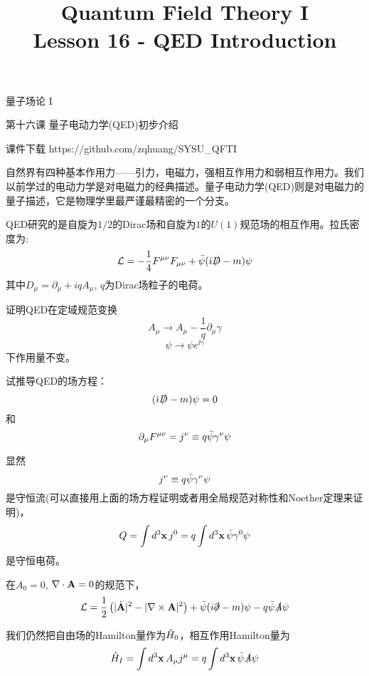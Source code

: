 \documentclass[CJK]{beamer}
\title{Quantum Field Theory I \\ Lesson 16 - QED Introduction}
\author{}
\date{}
\begin{document}
\begin{frame}
 
\begin{center}
\begin{Large}
\bch
量子场论 I 

{\vskip 0.3in}

第十六课 量子电动力学(QED)初步介绍

\ech
\end{Large}
\end{center}

\vskip 0.2in

\bch
课件下载
\ech
https://github.com/zqhuang/SYSU\_QFTI

\end{frame}

\begin{frame}
\bch
自然界有四种基本作用力——引力，电磁力，强相互作用力和弱相互作用力。我们以前学过的电动力学是对电磁力的经典描述。量子电动力学(QED)则是对电磁力的量子描述，它是物理学里最严谨最精密的一个分支。
\skipline

QED研究的是自旋为$1/2$的Dirac场和自旋为$1$的$U(1)$规范场的相互作用。拉氏密度为:
$${\mathcal{L}} = -\frac{1}{4}{F^{\mu\nu}}{F_{\mu\nu}} + \bar\psi({\dot{\imath}}\slashed{D} - m)\psi$$
其中$D_\mu = \partial_\mu + iq A_\mu$, $q$为Dirac场粒子的电荷。
\ech
\end{frame}


\begin{frame}
\bch
证明QED在定域规范变换
$$A_\mu \rightarrow A_\mu - \frac{1}{q}\partial_\mu \gamma$$
$$\psi \rightarrow \psi e^{\ii  \gamma}$$
下作用量不变。

\ech
\end{frame}


\begin{frame}
\bch
试推导QED的场方程：
$$({\dot{\imath}}\slashed{D} - m)\psi = 0$$
和
$$\partial_\mu {F^{\mu\nu}} = j^\nu \equiv q \bar{\psi} \gamma^\nu \psi$$
\ech
\end{frame}

\begin{frame}
\bch
显然
$$j^\nu \equiv q \bar{\psi} \gamma^\nu \psi$$
是守恒流(可以直接用上面的场方程证明或者用全局规范对称性和Noether定理来证明)，
$$ Q = \int d^3{\mathbf{x}}\, j^0  = q\int d^3{\mathbf{x}}\,\bar{\psi} \gamma^0\psi $$
是守恒电荷。
\ech
\end{frame}

\begin{frame}
\bch

在$A_0 = 0$, $\nabla\cdot {\mathbf{A}} = 0$的规范下，
$${\mathcal{L}} = \frac{1}{2}\left(|\dot{{\mathbf{A}}}|^2 - |\nabla\times {\mathbf{A}}|^2\right) + \bar{\psi}(i\slashed{\partial}-m)\psi - q\bar\psi\slashed{A}\psi$$


我们仍然把自由场的Hamilton量作为${\hat{H}}_0$，相互作用Hamilton量为
$${\hat{H}}_I = \int d^3{\mathbf{x}}\, A_\mu j^\mu = q \int d^3{\mathbf{x}}\, \bar{\psi}\slashed{A}\psi$$


\ech
\end{frame}
\end{document}
